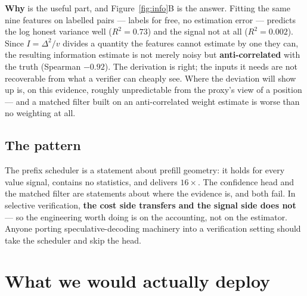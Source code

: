 \documentclass[11pt]{article}
\begin{document}
\textbf{Why} is the useful part, and Figure~\ref{fig:info}B is the answer. Fitting the
same nine features on labelled pairs --- labels for free, no estimation error ---
predicts the log honest variance well ($R^2 = 0.73$) and the signal not at all
($R^2 = 0.002$). Since $I = \Delta^2/v$ divides a quantity the features cannot
estimate by one they can, the resulting information estimate is not merely noisy but
\textbf{anti-correlated} with the truth (Spearman $-0.92$). The derivation is right;
the inputs it needs are not recoverable from what a verifier can cheaply see. Where the
deviation will show up is, on this evidence, roughly unpredictable from the proxy's
view of a position --- and a matched filter built on an anti-correlated weight estimate
is worse than no weighting at all.

\subsection{The pattern}

The prefix scheduler is a statement about prefill geometry: it holds for every value
signal, contains no statistics, and delivers $16\times$. The confidence head and the
matched filter are statements about where the evidence is, and both fail. In selective
verification, \textbf{the cost side transfers and the signal side does not} --- so the
engineering worth doing is on the accounting, not on the estimator. Anyone porting
speculative-decoding machinery into a verification setting should take the scheduler
and skip the head.

\section{What we would actually deploy}
\label{sec:deploy}
\end{document}
